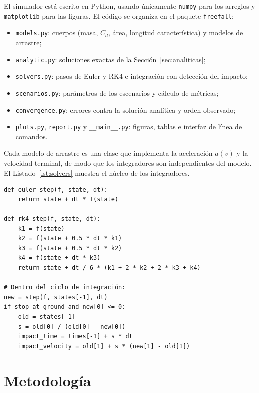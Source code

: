 El simulador está escrito en Python, usando únicamente \texttt{numpy} para los arreglos y \texttt{matplotlib} para las figuras. El código se organiza en el paquete \texttt{freefall}:
\begin{itemize}
  \item \texttt{models.py}: cuerpos (masa, $C_d$, área, longitud característica) y modelos de arrastre;
  \item \texttt{analytic.py}: soluciones exactas de la Sección~\ref{sec:analiticas};
  \item \texttt{solvers.py}: pasos de Euler y RK4 e integración con detección del impacto;
  \item \texttt{scenarios.py}: parámetros de los escenarios y cálculo de métricas;
  \item \texttt{convergence.py}: errores contra la solución analítica y orden observado;
  \item \texttt{plots.py}, \texttt{report.py} y \texttt{\_\_main\_\_.py}: figuras, tablas e interfaz de línea de comandos.
\end{itemize}
Cada modelo de arrastre es una clase que implementa la aceleración $a(v)$ y la velocidad terminal, de modo que los integradores son independientes del modelo. El Listado~\ref{lst:solvers} muestra el núcleo de los integradores.

\begin{lstlisting}[caption={Pasos de Euler y RK4 y detección del impacto (\texttt{solvers.py}).}, label={lst:solvers}]
def euler_step(f, state, dt):
    return state + dt * f(state)

def rk4_step(f, state, dt):
    k1 = f(state)
    k2 = f(state + 0.5 * dt * k1)
    k3 = f(state + 0.5 * dt * k2)
    k4 = f(state + dt * k3)
    return state + dt / 6 * (k1 + 2 * k2 + 2 * k3 + k4)

# Dentro del ciclo de integración:
new = step(f, states[-1], dt)
if stop_at_ground and new[0] <= 0:
    old = states[-1]
    s = old[0] / (old[0] - new[0])
    impact_time = times[-1] + s * dt
    impact_velocity = old[1] + s * (new[1] - old[1])
\end{lstlisting}

\section{Metodología}

